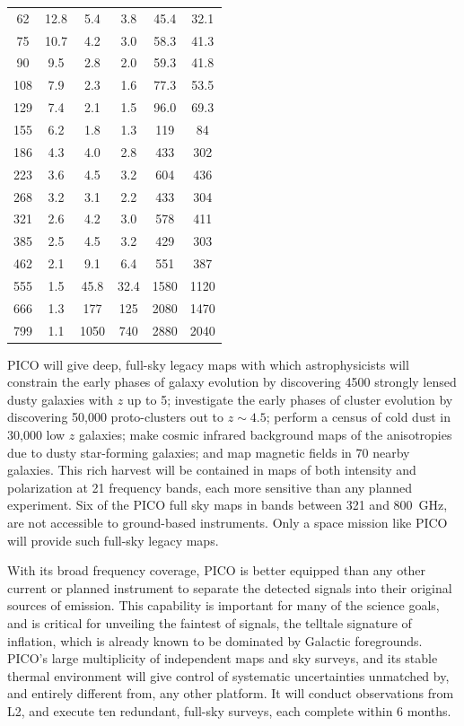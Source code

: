 \documentclass[PICOAPC.tex]{subfiles}
\begin{document}
\begin{table}
\begin{minipage}[t]{0.6\textwidth}
\begin{tabular}{|c|c|c|c|c|c|}
62& 12.8 & 5.4 & 3.8 & 45.4 & 32.1\\ 
75& 10.7 & 4.2 & 3.0 & 58.3 & 41.3\\ 
90 & 9.5 & 2.8 & 2.0 & 59.3 & 41.8\\ 
108 & 7.9 & 2.3 & 1.6 & 77.3 & 53.5\\ 
129 & 7.4 & 2.1 & 1.5 & 96.0 & 69.3\\ 
155 & 6.2 & 1.8 & 1.3 & 119 & 84\\ 
186 & 4.3 & 4.0 & 2.8 & 433 & 302\\ 
223 & 3.6 & 4.5 & 3.2 & 604 & 436\\ 
268 & 3.2 & 3.1 & 2.2 & 433 & 304\\ 
321 & 2.6 & 4.2 & 3.0 & 578 & 411\\ 
385 & 2.5 & 4.5 & 3.2 & 429 & 303\\ 
462 & 2.1 & 9.1 & 6.4 & 551 & 387\\ 
555 & 1.5 & 45.8 & 32.4 & 1580 & 1120\\ 
666 & 1.3 & 177 & 125 & 2080 & 1470\\ 
799 & 1.1 & 1050 & 740 & 2880 & 2040\\ 
\hline
\end{tabular}

\end{minipage}
\end{table}




PICO will give deep, full-sky legacy maps with which astrophysicists will constrain the early phases of galaxy evolution by discovering 4500 strongly lensed dusty galaxies with $z$ up to 5; investigate the early phases of cluster evolution by discovering 50,000 proto-clusters out to $z\sim4.5$; perform a census of cold dust in 30,000 low $z$ galaxies; make cosmic infrared background maps of the anisotropies due to dusty star-forming galaxies; and map magnetic fields in 70 nearby galaxies. This rich harvest will be contained in maps of both intensity and polarization at 21 frequency bands, each more sensitive than any planned experiment. Six of the PICO full sky maps in bands between 321 and 800~GHz, are not accessible to ground-based instruments. Only a space mission like PICO will provide such full-sky legacy maps. 



With its broad frequency coverage, PICO is better equipped than any other current or planned instrument to separate the detected signals into their original sources of emission.  This capability is important for many of the science goals, and is critical for unveiling the faintest of signals, the telltale signature of inflation, which is already known to be dominated by Galactic foregrounds. 
PICO's large multiplicity of independent maps and sky surveys, and its stable thermal environment will give control of systematic uncertainties unmatched by, and entirely different from, any other platform. It will conduct observations from L2, and execute ten redundant,  full-sky surveys, each complete within 6 months. 
\end{document}
